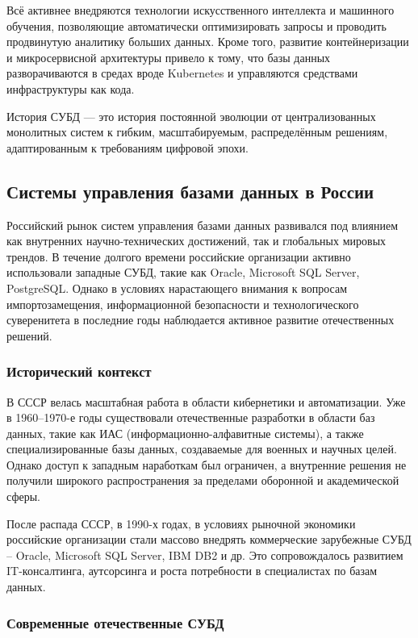 Всё активнее внедряются технологии искусственного интеллекта и машинного обучения, позволяющие автоматически оптимизировать запросы и проводить продвинутую аналитику больших данных. Кроме того, развитие контейнеризации и микросервисной архитектуры привело к тому, что базы данных разворачиваются в средах вроде Kubernetes и управляются средствами инфраструктуры как кода.

История СУБД — это история постоянной эволюции от централизованных монолитных систем к гибким, масштабируемым, распределённым решениям, адаптированным к требованиям цифровой эпохи.

\subsection{Системы управления базами данных в России}

Российский рынок систем управления базами данных развивался под влиянием как внутренних научно-технических достижений, так и глобальных мировых трендов. В течение долгого времени российские организации активно использовали западные СУБД, такие как Oracle, Microsoft SQL Server, PostgreSQL. Однако в условиях нарастающего внимания к вопросам импортозамещения, информационной безопасности и технологического суверенитета в последние годы наблюдается активное развитие отечественных решений.

\subsubsection{Исторический контекст}

В СССР велась масштабная работа в области кибернетики и автоматизации. Уже в 1960--1970-е годы существовали отечественные разработки в области баз данных, такие как ИАС (информационно-алфавитные системы), а также специализированные базы данных, создаваемые для военных и научных целей. Однако доступ к западным наработкам был ограничен, а внутренние решения не получили широкого распространения за пределами оборонной и академической сферы.

После распада СССР, в 1990-х годах, в условиях рыночной экономики российские организации стали массово внедрять коммерческие зарубежные СУБД -- Oracle, Microsoft SQL Server, IBM DB2 и др. Это сопровождалось развитием IT-консалтинга, аутсорсинга и роста потребности в специалистах по базам данных.

\subsubsection{Современные отечественные СУБД}

